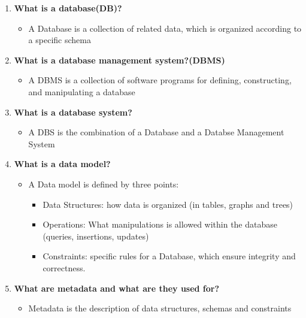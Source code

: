 \documentclass{article}
\begin{document}
\begin{enumerate}
	\item \textbf{What is a database(DB)?}
	
	\begin{itemize}
		\item A Database is a collection of related data, which is organized according to a specific schema
	\end{itemize}
	
	\item \textbf{What is a database management system?(DBMS)}
	\begin{itemize}
		\item A DBMS is a collection of software programs for defining, constructing, and manipulating a database
	\end{itemize}
	
	\item \textbf{What is a database system?}
	\begin{itemize}
		\item A DBS is the combination of a Database and a Databse Management System
	\end{itemize}
	
	\item \textbf{What is a data model?}
	\begin{itemize}
		\item A Data model is defined by three points:
		\begin{itemize}
			\item Data Structures: how data is organized (in tables, graphs and trees)
			\item Operations: What manipulations is allowed within the database (queries, insertions, updates)
			\item Constraints: specific rules for a Database, which ensure integrity and correctness.
		\end{itemize}
	\end{itemize}
	
	\item \textbf{What are metadata and what are they used for?}
	\begin{itemize}
		\item Metadata is the description of data structures, schemas and constraints
	\end{itemize}
\end{enumerate}


\end{document}
